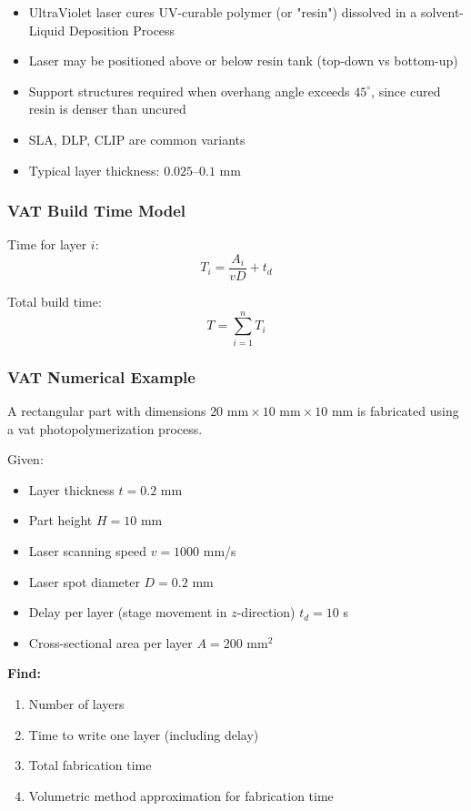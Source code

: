 \documentclass{article}
\begin{document}
\begin{itemize}
    \item UltraViolet laser cures UV-curable polymer (or "resin") dissolved in a solvent- Liquid Deposition Process
    \item Laser may be positioned above or below resin tank (top-down vs bottom-up)
    \item Support structures required when overhang angle exceeds $45^\circ$, since cured resin is denser than uncured
    \item SLA, DLP, CLIP are common variants
    \item Typical layer thickness: $0.025$–$0.1$ mm
\end{itemize}

\subsubsection{VAT Build Time Model}

Time for layer $i$:
\[
T_i = \frac{A_i}{vD} + t_d
\]

Total build time:
\[
T = \sum_{i=1}^{n} T_i
\]

\subsubsection{VAT Numerical Example}
A rectangular part with dimensions $20 \text{ mm} \times 10 \text{ mm} \times 10 \text{ mm}$ is fabricated using a vat photopolymerization process.

Given:
\begin{itemize}
    \item Layer thickness $t = 0.2$ mm
    \item Part height $H = 10$ mm
    \item Laser scanning speed $v = 1000$ mm/s
    \item Laser spot diameter $D = 0.2$ mm
    \item Delay per layer (stage movement in $z$-direction) $t_d = 10$ s
    \item Cross-sectional area per layer $A = 200$ mm$^2$
\end{itemize}

\textbf{Find:}
\begin{enumerate}
    \item Number of layers
    \item Time to write one layer (including delay)
    \item Total fabrication time
    \item Volumetric method approximation for fabrication time
\end{enumerate}
\end{document}
